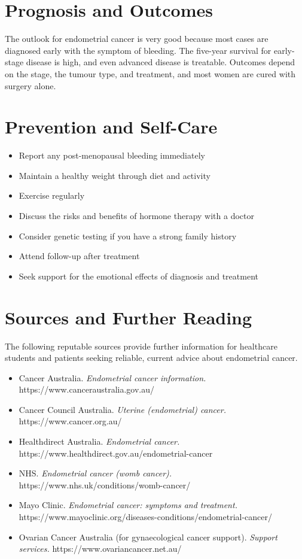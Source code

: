 \section*{Prognosis and Outcomes}
The outlook for endometrial cancer is very good because most cases are diagnosed early with the symptom of bleeding. The five-year survival for early-stage disease is high, and even advanced disease is treatable. Outcomes depend on the stage, the tumour type, and treatment, and most women are cured with surgery alone.

\section*{Prevention and Self-Care}
\begin{itemize}
    \item Report any post-menopausal bleeding immediately
    \item Maintain a healthy weight through diet and activity
    \item Exercise regularly
    \item Discuss the risks and benefits of hormone therapy with a doctor
    \item Consider genetic testing if you have a strong family history
    \item Attend follow-up after treatment
    \item Seek support for the emotional effects of diagnosis and treatment
\end{itemize}

\section*{Sources and Further Reading}
The following reputable sources provide further information for healthcare students and patients seeking reliable, current advice about endometrial cancer.
\begin{itemize}
    \item Cancer Australia. \textit{Endometrial cancer information.} https://www.canceraustralia.gov.au/
    \item Cancer Council Australia. \textit{Uterine (endometrial) cancer.} https://www.cancer.org.au/
    \item Healthdirect Australia. \textit{Endometrial cancer.} https://www.healthdirect.gov.au/endometrial-cancer
    \item NHS. \textit{Endometrial cancer (womb cancer).} https://www.nhs.uk/conditions/womb-cancer/
    \item Mayo Clinic. \textit{Endometrial cancer: symptoms and treatment.} https://www.mayoclinic.org/diseases-conditions/endometrial-cancer/
    \item Ovarian Cancer Australia (for gynaecological cancer support). \textit{Support services.} https://www.ovariancancer.net.au/
\end{itemize}
